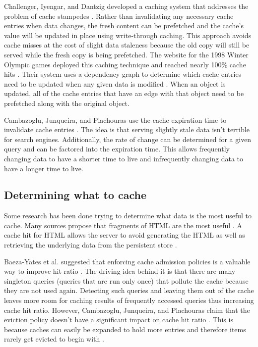 \documentclass[12pt]{ucthesis}
\begin{document}
Challenger, Iyengar, and Dantzig developed a caching system that addresses the problem of cache stampedes \cite{scalableConsistentCaching}.
Rather than invalidating any necessary cache entries when data changes, the fresh content can be prefetched and the cache's value will be updated in place using write-through caching.
This approach avoids cache misses at the cost of slight data staleness because the old copy will still be served while the fresh copy is being prefetched.
The website for the 1998 Winter Olympic games deployed this caching technique and reached nearly 100\% cache hits \cite{scalableConsistentCaching}.
Their system uses a dependency graph to determine which cache entries need to be updated when any given data is modified \cite{scalableConsistentCaching}.
When an object is updated, all of the cache entries that have an edge with that object need to be prefetched along with the original object.

Cambazoglu, Junqueira, and Plachouras use the cache expiration time to invalidate cache entries \cite{refreshingPerspectiveSearch}.
The idea is that serving slightly stale data isn't terrible for search engines.
Additionally, the rate of change can be determined for a given query and can be factored into the expiration time.
This allows frequently changing data to have a shorter time to live and infrequently changing data to have a longer time to live.

\subsection{Determining what to cache}
Some research has been done trying to determine what data is the most useful to cache.
Many sources propose that fragments of HTML are the most useful \cite{comparisonOfCachingSolutions, scalableConsistentCaching}.
A cache hit for HTML allows the server to avoid generating the HTML as well as retrieving the underlying data from the persistent store \cite{howBasecampGotSoFast}.

Baeza-Yates et al. suggested that enforcing cache admission policies is a valuable way to improve hit ratio \cite{cacheAdmissionPolicies}.
The driving idea behind it is that there are many singleton queries (queries that are run only once) that pollute the cache because they are not used again.
Detecting such queries and leaving them out of the cache leaves more room for caching results of frequently accessed queries thus increasing cache hit ratio.
However, Cambazoglu, Junqueira, and Plachouras claim that the eviction policy doesn't have a significant impact on cache hit ratio \cite{refreshingPerspectiveSearch}.
This is because caches can easily be expanded to hold more entries and therefore items rarely get evicted to begin with \cite{refreshingPerspectiveSearch}.
\end{document}
